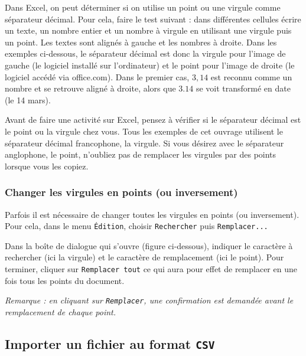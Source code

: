 \vspace{6pt}

Dans Excel, on peut déterminer si on utilise un point ou une virgule comme séparateur décimal. Pour cela, faire le test suivant : dans différentes cellules écrire un texte, un nombre entier et un nombre à virgule en utilisant une virgule puis un point. Les textes sont alignés à gauche et les nombres à droite. Dans les exemples ci-dessous, le séparateur décimal est donc la virgule pour l'image de gauche (le logiciel installé sur l'ordinateur) et le point pour l'image de droite (le logiciel accédé via office.com). Dans le premier cas, $3,14$ est reconnu comme un nombre et se retrouve aligné à droite, alors que $3.14$ se voit transformé en date (le 14 mars).


Avant de faire une activité sur Excel, pensez à vérifier si le séparateur décimal est le point ou la virgule chez vous. Tous les exemples de cet ouvrage utilisent le séparateur décimal francophone, la virgule. Si vous désirez avec le séparateur anglophone, le point, n'oubliez pas de remplacer les virgules par des points lorsque vous les copiez.

\subsubsection{Changer les virgules en points (ou inversement)}

Parfois il est nécessaire de changer toutes les virgules en points (ou inversement). Pour cela, dans le menu \texttt{Édition}, choisir \texttt{Rechercher} puis \texttt{Remplacer...}


Dans la boîte de dialogue qui s'ouvre (figure ci-dessous), indiquer le caractère à rechercher  (ici la virgule) et le caractère de remplacement  (ici le point). Pour terminer, cliquer sur \texttt{Remplacer tout}  ce qui aura pour effet de remplacer en une fois tous les points du document.

\emph{Remarque : en cliquant sur \texttt{Remplacer}, une confirmation est demandée avant le remplacement de chaque point.}



\subsection{Importer un fichier au format \texttt{CSV}}\label{Calc3fichierCSV}

